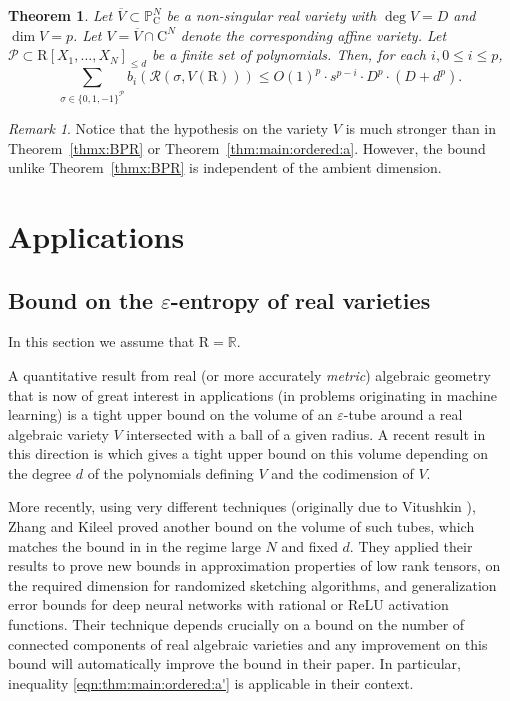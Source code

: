 \documentclass[10pt]{amsart}
\newtheorem{theorem}{Theorem}
\theoremstyle{definition}
\theoremstyle{remark}
\newtheorem{remark}{Remark}
\numberwithin{equation}{section}
\newcommand {\R} {\mathrm{R}}
\newcommand {\C}     {\mathrm{C}}
\newcommand {\RR} {{\mathcal R}}
\newcommand {\eps} {{\varepsilon}}
\newcommand {\PP}     {\mathbb{P}} %
\begin{document}
\begin{theorem}
\label{thm:BPR+}
Let $\overline{V} \subset \PP_\C^N$ be a non-singular real variety 
with $\deg V = D$ and $\dim V = p$. Let $V = \overline{V} \cap \C^N$ denote the corresponding affine variety. Let $\mathcal{P} \subset \R[X_1,\ldots,X_N]_{\leq d}$ be a finite set of polynomials. Then,
for each $i, 0 \leq i \leq p$,
\[
\sum_{\sigma \in \{0,1,-1\}^{\mathcal{P}}} b_i(\RR(\sigma,V(\R))) 
\leq
O(1)^p \cdot s^{p-i} \cdot D^p \cdot (D + d^p). 
\]
\end{theorem}

\begin{remark}
    \label{rem:BPR+} Notice that the hypothesis on the variety $V$ is much stronger than in Theorem~\ref{thmx:BPR} or Theorem~\ref{thm:main:ordered:a}. 
    However, the bound  unlike Theorem~\ref{thmx:BPR} is independent of the ambient dimension.
\end{remark}




\section{Applications}
\label{sec:applications}

\subsection{Bound on the $\eps$-entropy of real varieties}
\label{subsec:entropy}
In this section we assume that $\R = \mathbb{R}$.

A quantitative result from real (or more accurately \emph{metric}) algebraic geometry that is now of great interest in applications (in problems originating in machine learning) is a tight upper bound on the volume of an $\eps$-tube around a real algebraic variety $V$ intersected with a ball of a given radius. A recent result in this direction is \cite[Theorem 1.1]{Basu-Lerario2023}  which gives 
a tight upper bound on this volume depending on the degree $d$ of the polynomials defining $V$ and the codimension of $V$.


More recently, using very different techniques (originally due to Vitushkin \cite{Vitushkin1957}), Zhang and Kileel \cite{Zhang-Kileel2023} proved another bound on the volume of such tubes, which matches the bound in \cite{Basu-Lerario2023} in the regime large $N$ and
fixed $d$. 
They applied their results to prove new bounds in approximation properties of low rank tensors, on the required dimension for randomized sketching algorithms, and 
generalization error bounds for deep neural networks
with rational or ReLU activation functions.
Their technique depends crucially on a bound on the number of connected components of real algebraic varieties and any improvement
on this bound will automatically improve the bound in their paper.
In particular, inequality \eqref{eqn:thm:main:ordered:a'} is applicable in their context.
\end{document}
